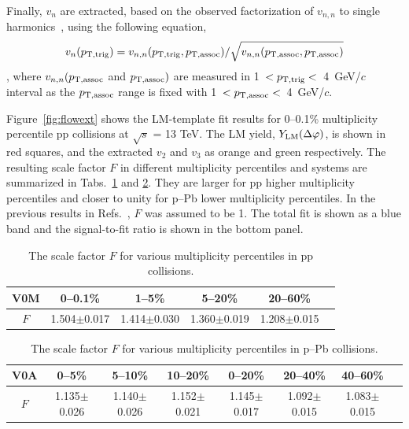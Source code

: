 Finally, $v_{n}$ are extracted, based on the observed factorization of $v_{n,n}$ to single harmonics~\cite{ATLAS:2015hzw,ATLAS:2016yzd}, using the following equation\quad,
\begin{eqnarray}
v_{n}(p_{\rm{T,trig}}) = v_{n,n}(p_{\rm{T,trig}}, p_{\rm{T,assoc}}) / \sqrt{ v_{n,n}(p_{\rm{T,assoc}},p_{\rm{T,assoc}})}
\end{eqnarray}
, where $v_{n,n}(p_{\rm{T,assoc}}$ and $p_{\rm{T,assoc}})$ are measured in 1~$<p_{\rm{T,trig}}<$~4~GeV/$c$ interval as the $p_{\rm{T,assoc}}$ range is fixed with 1~$<p_{\rm{T,assoc}}<$~4~GeV/$c$.

Figure~\ref{fig:flowext} shows the LM-template fit results for 0--0.1\% multiplicity percentile pp collisions at $\sqrt{s}$ = 13 TeV. The LM yield,  $Y_{\rm{LM}}(\Delta\varphi)$, is shown in red squares, and the extracted $v_{2}$ and $v_{3}$ as orange and green respectively. The resulting scale factor $F$ in different multiplicity percentiles and systems are summarized in Tabs.~\ref{tab:Fpp} and \ref{tab:Fpb}. They are larger for pp higher multiplicity percentiles and closer to unity for p--Pb lower multiplicity percentiles. In the previous results in Refs.~\cite{ALICE:2012eyl,ALICE:2013snk}, $F$ was assumed to be 1. The total fit is shown as a blue band and the signal-to-fit ratio is shown in the bottom panel. 
\begin{table}[h!]
\caption{The scale factor $F$ for various multiplicity percentiles in pp collisions.}
\centering
\begin{tabular}{|c|cccc|c}
\hline
 V0M& 0--0.1\% & 1--5\% & 5--20\% & 20--60\% \\ 
 \hline
 $F$ & 1.504$\pm$0.017 & 1.414$\pm$0.030 & 1.360$\pm$0.019 & 1.208$\pm$0.015 \\  
 \hline
 \end{tabular}
 \label{tab:Fpp}
 
\end{table}

\begin{table}[h!]
\caption{The scale factor $F$ for various multiplicity percentiles in p--Pb collisions.}
\centering
\begin{tabular}{|c|cccccc|c}
 \hline
 V0A& 0--5\% & 5--10\% & 10--20\% & 0--20\% & 20--40\% & 40--60\% \\ 
 \hline
 $F$& 1.135$\pm$0.026 & 1.140$\pm$0.026 & 1.152$\pm$0.021 & 1.145$\pm$0.017 &1.092$\pm$0.015 & 1.083$\pm$0.015 \\  
 \hline
\end{tabular}
\label{tab:Fpb}
\end{table}

